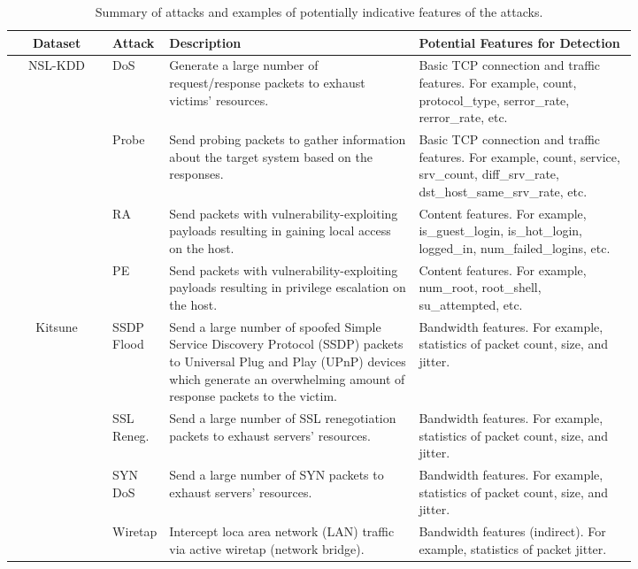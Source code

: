 \documentclass{article}
\begin{document}
\begin{table}[]
    \centering
    \caption{Summary of attacks and examples of potentially indicative features of the attacks.}
  \begin{adjustbox}{width=\textwidth}
    \begin{tabular}{c| >{\centering\arraybackslash}m{0.07\linewidth}|m{0.4\linewidth}|m{0.35\linewidth}}
    \toprule
        Dataset & Attack & Description & Potential Features for Detection \\
        \midrule
        \multirow{4}{*}[-45pt]{NSL-KDD} & DoS & Generate a large number of request/response packets to exhaust victims' resources. & Basic TCP connection and traffic features. For example, count, protocol\_type, serror\_rate, rerror\_rate, etc.\\
        \cline{2-4}
         & Probe &Send probing packets to gather information about the target system based on the responses. &Basic TCP connection and traffic features. For example, count, service, srv\_count, diff\_srv\_rate, dst\_host\_same\_srv\_rate, etc. \\
        \cline{2-4}
         & RA &Send packets with vulnerability-exploiting payloads resulting in gaining local access on the host. &Content features. For example, is\_guest\_login, is\_hot\_login, logged\_in, num\_failed\_logins, etc.\\
        \cline{2-4}
         & PE & Send packets with vulnerability-exploiting payloads resulting in privilege escalation on the host. &Content features. For example, num\_root, root\_shell, su\_attempted, etc.\\
         \midrule
        \multirow{7}{*}[-35pt]{Kitsune} & SSDP Flood & Send a large number of spoofed Simple Service Discovery Protocol (SSDP) packets to Universal Plug and Play (UPnP) devices which generate an overwhelming amount of response packets to the victim. &Bandwidth features. For example, statistics of packet count, size, and jitter. \\
        \cline{2-4}
         & SSL Reneg. &Send a large number of SSL renegotiation packets to exhaust servers' resources. &Bandwidth features. For example, statistics of packet count, size, and jitter. \\
        \cline{2-4}
         & SYN DoS &Send a large number of SYN packets to exhaust servers' resources. &Bandwidth features. For example, statistics of packet count, size, and jitter. \\
        \cline{2-4}
         & Wiretap &Intercept loca area network (LAN) traffic via active wiretap (network bridge). & Bandwidth features (indirect). For example, statistics of packet jitter.\\

\end{tabular}
\end{adjustbox}
\end{table}
\end{document}
